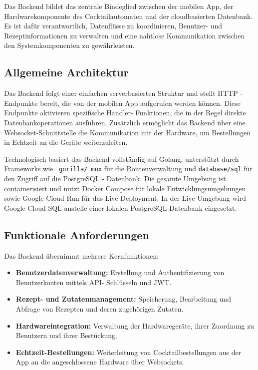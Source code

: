 Das Backend bildet das zentrale Bindeglied zwischen der mobilen App, der Hardwarekomponente des 
Cocktailautomaten und der cloudbasierten Datenbank. Es ist dafür verantwortlich, Datenflüsse zu 
koordinieren, Benutzer- und Rezeptinformationen zu verwalten und eine nahtlose Kommunikation 
zwischen den Systemkomponenten zu gewährleisten.

\subsection{Allgemeine Architektur}

Das Backend folgt einer einfachen serverbasierten Struktur und stellt HTTP - Endpunkte bereit, die 
von der mobilen App aufgerufen werden können. Diese Endpunkte aktivieren spezifische Handler-
Funktionen, die in der Regel direkte Datenbankoperationen ausführen. Zusätzlich ermöglicht das 
Backend über eine Websocket-Schnittstelle die Kommunikation mit der Hardware, um Bestellungen in 
Echtzeit an die Geräte weiterzuleiten.

Technologisch basiert das Backend vollständig auf Golang, unterstützt durch Frameworks wie \texttt{
gorilla/ mux} für die Routenverwaltung und \texttt{database/sql} für den Zugriff auf die PostgreSQL 
- Datenbank. Die gesamte Umgebung ist containerisiert und nutzt Docker Compose für lokale 
Entwicklungsumgebungen sowie Google Cloud Run für das Live-Deployment. In der Live-Umgebung wird 
Google Cloud SQL anstelle einer lokalen PostgreSQL-Datenbank eingesetzt.

\subsection{Funktionale 
Anforderungen}

Das Backend übernimmt mehrere Kernfunktionen:

\begin{itemize}
	\item \textbf{\textcolor{red7}{Benutzerdatenverwaltung:}} Erstellung und Authentifizierung von Benutzerkonten mittels API-
	Schlüsseln und JWT.
	\item \textbf{\textcolor{red7}{Rezept- und Zutatenmanagement:}} Speicherung, Bearbeitung und Abfrage von Rezepten und deren 
	zugehörigen Zutaten.
	\item \textbf{\textcolor{red7}{Hardwareintegration:}} Verwaltung der Hardwaregeräte, ihrer Zuordnung zu Benutzern und ihrer 
	Bestückung.
	\item \textbf{\textcolor{red7}{Echtzeit-Bestellungen:}} Weiterleitung von Cocktailbestellungen aus der App an die 
	angeschlossene Hardware über Websockets.
\end{itemize}

